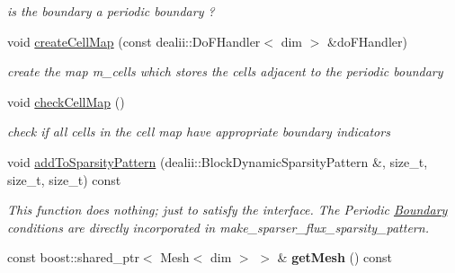 \begin{DoxyCompactItemize}
\begin{DoxyCompactList}\small\item\em is the boundary a periodic boundary ? \item\end{DoxyCompactList}\item 
void \hyperlink{classnatrium_1_1PeriodicBoundary_a233d460baa307b13bc32efb57c07f7c5}{createCellMap} (const dealii::DoFHandler$<$ dim $>$ \&doFHandler)
\begin{DoxyCompactList}\small\item\em create the map m\_\-cells which stores the cells adjacent to the periodic boundary \item\end{DoxyCompactList}\item 
\hypertarget{classnatrium_1_1PeriodicBoundary_a036bc3340a3217dfe4f916d5c2b29299}{
void \hyperlink{classnatrium_1_1PeriodicBoundary_a036bc3340a3217dfe4f916d5c2b29299}{checkCellMap} ()}
\label{classnatrium_1_1PeriodicBoundary_a036bc3340a3217dfe4f916d5c2b29299}

\begin{DoxyCompactList}\small\item\em check if all cells in the cell map have appropriate boundary indicators \item\end{DoxyCompactList}\item 
\hypertarget{classnatrium_1_1PeriodicBoundary_a8523a2b22bfacc8aa299c5a9c238ffdd}{
void \hyperlink{classnatrium_1_1PeriodicBoundary_a8523a2b22bfacc8aa299c5a9c238ffdd}{addToSparsityPattern} (dealii::BlockDynamicSparsityPattern \&, size\_\-t, size\_\-t, size\_\-t) const }
\label{classnatrium_1_1PeriodicBoundary_a8523a2b22bfacc8aa299c5a9c238ffdd}

\begin{DoxyCompactList}\small\item\em This function does nothing; just to satisfy the interface. The Periodic \hyperlink{classnatrium_1_1Boundary}{Boundary} conditions are directly incorporated in make\_\-sparser\_\-flux\_\-sparsity\_\-pattern. \item\end{DoxyCompactList}\item 
\hypertarget{classnatrium_1_1PeriodicBoundary_a1351b925b9ae2008539a351a4baac3e0}{
const boost::shared\_\-ptr$<$ Mesh$<$ dim $>$ $>$ \& {\bfseries getMesh} () const }
\label{classnatrium_1_1PeriodicBoundary_a1351b925b9ae2008539a351a4baac3e0}


\end{DoxyCompactItemize}
